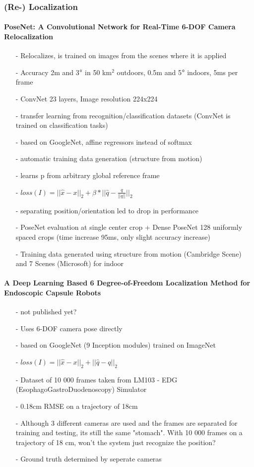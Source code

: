 \documentclass{article}
\begin{document}
	\subsubsection{(Re-) Localization}
	\paragraph{PoseNet: A Convolutional Network for Real-Time 6-DOF Camera Relocalization \cite{Kendall}}
	\begin{itemize}
			\item[-] Relocalizes, is trained on images from the scenes where it is applied	\item[-] Accuracy 2m and 3$\degree$  in 50 km$^2$ outdoors, 0.5m and 5$\degree$ indoors, 5ms per frame
		\item[-] ConvNet 23 layers, Image resolution 224x224
		\item[-] transfer learning from recognition/classification datasets (ConvNet is trained on classification tasks)
		\item[-] based on GoogleNet, affine regressors instead of softmax\item[-] automatic training data generation (structure from motion)
		\item[-] learns p from arbitrary global reference frame
		\item[-] $loss(I) = || \hat{x}-x||_2 + \beta*||\hat{q}-\frac{q}{||q||}||_2$
		\item[-] separating position/orientation led to drop in performance
		\item[-] PoseNet evaluation at single center crop + Dense PoseNet 128 uniformly spaced crops (time increase 95ms, only slight accuracy increase)
		\item[-] Training data generated using structure from motion (Cambridge Scene) and 7 Scenes (Microsoft) for indoor

	\end{itemize}
	 \paragraph{A Deep Learning Based 6 Degree-of-Freedom
	 	Localization Method for Endoscopic Capsule Robots \cite{Turan2017}}
	 	\begin{itemize}
	 		\item[-] not published yet?
	 		\item[-] Uses 6-DOF camera pose directly
	 		\item[-] based on GoogleNet (9 Inception modules) trained on ImageNet
	 		\item[-] $loss(I) = ||\hat{x}-x||_2 + ||\hat{q}-q||_2$
	 		\item[-] Dataset of 10 000 frames taken from LM103 - EDG (EsophagoGastroDuodenoscopy) Simulator
	 		\item[-] 0.18cm RMSE on a trajectory of 18cm
	 		\item[-] Although 3 different cameras are used and the frames are separated for training and testing, its still the same "stomach". With 10 000 frames on a trajectory of 18 cm, won't the system just recognize the position?
	 		\item[-] Ground truth determined by seperate cameras 
	 	\end{itemize}
\end{document}
